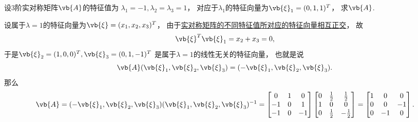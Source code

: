 \begin{example}
设3阶实对称矩阵\(\vb{A}\)的特征值为
\(\lambda_1=-1,\lambda_2=\lambda_3=1\)，
对应于\(\lambda_1\)的特征向量为\(\vb{\xi}_1=(0,1,1)^T\)，
求\(\vb{A}\).
\begin{solution}
设属于\(\lambda=1\)的特征向量为\(\vb{\xi}=(x_1,x_2,x_3)^T\)，
由于\hyperref[theorem:特征值与特征向量.实对称矩阵2]{实对称矩阵的不同特征值所对应的特征向量相互正交}，
故\[
	\vb{\xi}^T \vb{\xi}_1 = x_2+x_3 = 0,
\]
于是\(\vb{\xi}_2=(1,0,0)^T,
\vb{\xi}_3=(0,1,-1)^T\)
是属于\(\lambda=1\)的线性无关的特征向量，
也就是说\[
	\vb{A}(\vb{\xi}_1,\vb{\xi}_2,\vb{\xi}_3)
	=(-\vb{\xi}_1,\vb{\xi}_2,\vb{\xi}_3).
\]
那么\[
	\vb{A}
	=(-\vb{\xi}_1,\vb{\xi}_2,\vb{\xi}_3)
	(\vb{\xi}_1,\vb{\xi}_2,\vb{\xi}_3)^{-1}
	=\begin{bmatrix}
		0 & 1 & 0 \\
		-1 & 0 & 1 \\
		-1 & 0 & -1
	\end{bmatrix}
	\begin{bmatrix}
		0 & \frac{1}{2} & \frac{1}{2} \\
		1 & 0 & 0 \\
		0 & \frac{1}{2} & -\frac{1}{2}
	\end{bmatrix}
	=\begin{bmatrix}
		1 & 0 & 0 \\
		0 & 0 & -1 \\
		0 & -1 & 0
	\end{bmatrix}.
\]
\end{solution}
\end{example}

